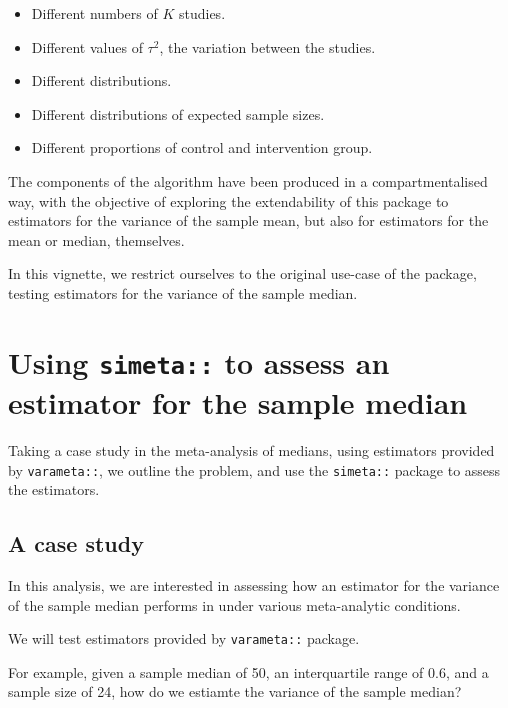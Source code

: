 \documentclass[
]{article}
\providecommand{\tightlist}{%
  \setlength{\itemsep}{0pt}\setlength{\parskip}{0pt}}
\begin{document}
\begin{itemize}
\tightlist
\item
  Different numbers of \(K\) studies.
\item
  Different values of \(\tau^2\), the variation between the studies.
\item
  Different distributions.
\item
  Different distributions of expected sample sizes.
\item
  Different proportions of control and intervention group.
\end{itemize}

The components of the algorithm have been produced in a
compartmentalised way, with the objective of exploring the extendability
of this package to estimators for the variance of the sample mean, but
also for estimators for the mean or median, themselves.

In this vignette, we restrict ourselves to the original use-case of the
package, testing estimators for the variance of the sample median.

\hypertarget{using-simeta-to-assess-an-estimator-for-the-sample-median}{%
\section{\texorpdfstring{Using \texttt{simeta::} to assess an estimator
for the sample
median}{Using simeta:: to assess an estimator for the sample median}}\label{using-simeta-to-assess-an-estimator-for-the-sample-median}}

Taking a case study in the meta-analysis of medians, using estimators
provided by \texttt{varameta::}, we outline the problem, and use the
\texttt{simeta::} package to assess the estimators.

\hypertarget{a-case-study}{%
\subsection{A case study}\label{a-case-study}}

In this analysis, we are interested in assessing how an estimator for
the variance of the sample median performs in under various
meta-analytic conditions.

We will test estimators provided by \texttt{varameta::} package.

For example, given a sample median of 50, an interquartile range of 0.6,
and a sample size of 24, how do we estiamte the variance of the sample
median?
\end{document}
